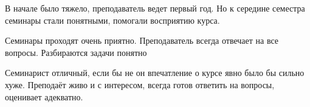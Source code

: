             \begin{commentbox} 
                В начале было тяжело, преподаватель ведет первый год. Но к середине семестра семинары стали понятными, помогали восприятию курса.  
            \end{commentbox} 
        
            \begin{commentbox} 
                Семинары проходят очень приятно. Преподаватель всегда отвечает на все вопросы. Разбираются задачи понятно  
            \end{commentbox} 
        
            \begin{commentbox} 
                Семинарист отличный, если бы не он впечатление о курсе явно было бы сильно хуже. Преподаёт живо и с интересом, всегда готов ответить на вопросы, оценивает адекватно. 
            \end{commentbox} 


